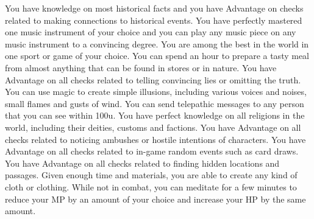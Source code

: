 \vfill
{}
{
	You have knowledge on most historical facts and you have Advantage on checks related to making connections to historical events. 	 
}
\vfill
{}
{
	You have perfectly mastered one music instrument of your choice and you can play any music piece on any music instrument to a convincing degree.
}
\vfill
{}
{
	You are among the best in the world in one sport or game of your choice.
}
\vfill
{}
{
	You can spend an hour to prepare a tasty meal from almost anything that can be found in stores or in nature.
}
\vfill
{}
{
	You have Advantage on all checks related to telling convincing lies or omitting the truth.
}
\vfill
{}
{
	You can use magic to create simple illusions, including various voices and noises, small flames and gusts of wind.
}
\vfill
{}
{
	You can send telepathic messages to any person that you can see within 100u.
}
\vfill
{}
{
	You have perfect knowledge on all religions in the world, including their deities, customs and factions.
}
\vfill
{}
{
	You have Advantage on all checks related to noticing ambushes or hostile intentions of characters.
}
\vfill
{}
{
	You have Advantage on all checks related to in-game random events such as card draws.
}
\vfill
{}
{
	You have Advantage on all checks related to finding hidden locations and passages. 	 
}
\vfill
{}
{
	Given enough time and materials, you are able to create any kind of cloth or clothing.
}
\vfill
{}
{
	While not in combat, you can meditate for a few minutes to reduce your MP by an amount of your choice and increase your HP by the same amount.
}
%
\clearpage